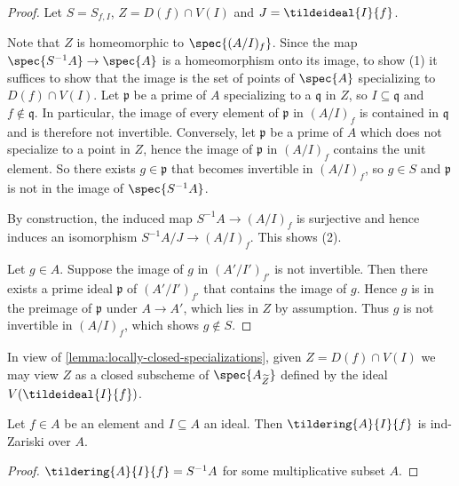 \begin{proof}
    \leanok
    Let $S = S_{f, I}$, $Z = D(f) \cap V(I)$ and $J = \tildeideal{I}{f}$.

    Note that $Z$ is homeomorphic to $\spec{(A/I)_f}$.
    Since the map $\spec{S^{-1}A} \to \spec{A}$ is a homeomorphism onto its image, to show (1)
    it suffices to show that the image is the set of points of $\spec{A}$ specializing to $D(f) \cap V(I)$.
    Let $\mathfrak{p}$ be a prime of $A$ specializing to a $\mathfrak{q}$ in $Z$,
    so $I \subseteq \mathfrak{q}$ and $f \not\in \mathfrak{q}$. In particular, the image
    of every element of $\mathfrak{p}$ in $(A / I)_f$ is contained in $\mathfrak{q}$ and
    is therefore not invertible.
    Conversely, let $\mathfrak{p}$ be a prime of $A$ which does not specialize to a point in
    $Z$, hence
    the image of $\mathfrak{p}$ in $(A/I)_f$ contains the unit element. So there exists
    $g \in \mathfrak{p}$ that becomes invertible in $(A / I)_f$, so $g \in S$ and
    $\mathfrak{p}$ is not in the image of $\spec{S^{-1} A}$.

    By construction, the induced map $S^{-1}A \to (A / I)_f$ is surjective and hence
    induces an isomorphism $S^{-1}A / J \to (A / I)_f$. This shows (2).

    Let $g \in A$. Suppose the image of $g$ in $(A' / I')_{f'}$ is not invertible.
    Then there exists a prime ideal $\mathfrak{p}$ of $(A' / I')_{f'}$ that contains the image of $g$.
    Hence $g$ is in the preimage of $\mathfrak{p}$ under $A \to A'$, which lies in $Z$ by assumption. Thus
    $g$ is not invertible in $(A / I)_f$, which shows $g \not\in S$.
\end{proof}

In view of \ref{lemma:locally-closed-specializations}, given $Z = D(f) \cap V(I)$ we may
view $Z$ as a closed subscheme of $\spec{A_{\widetilde{Z}}}$ defined by the ideal
$V( \tildeideal{I}{f})$.

\begin{lemma}
    Let $f \in A$ be an element and $I \subseteq A$ an ideal. Then
    $\tildering{A}{I}{f}$ is ind-Zariski over $A$.
    \label{lemma:tilde-locclosed-ind-zariski}
    \leanok
\end{lemma}

\begin{proof}
    $\tildering{A}{I}{f} = S^{-1} A$ for some multiplicative subset $A$.
    \leanok
\end{proof}

